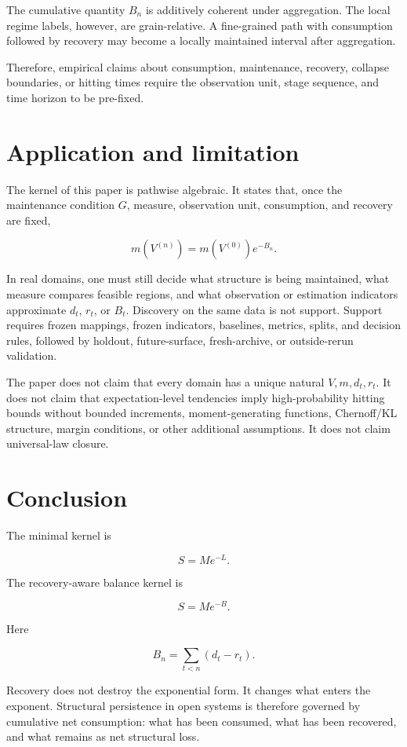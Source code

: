 \documentclass[12pt,a4paper]{article}
\begin{document}
The cumulative quantity \(B_{n}\) is additively coherent under aggregation. The local regime labels, however, are grain-relative. A fine-grained path with consumption followed by recovery may become a locally maintained interval after aggregation.

Therefore, empirical claims about consumption, maintenance, recovery, collapse boundaries, or hitting times require the observation unit, stage sequence, and time horizon to be pre-fixed.

\section{Application and limitation}\label{application-and-limitation}

The kernel of this paper is pathwise algebraic. It states that, once the maintenance condition \(G\), measure, observation unit, consumption, and recovery are fixed,

\[
m(V^{(n)})=m(V^{(0)})e^{-B_{n}}.
\]

In real domains, one must still decide what structure is being maintained, what measure compares feasible regions, and what observation or estimation indicators approximate \(d_{t}\), \(r_{t}\), or \(B_{t}\). Discovery on the same data is not support. Support requires frozen mappings, frozen indicators, baselines, metrics, splits, and decision rules, followed by holdout, future-surface, fresh-archive, or outside-rerun validation.

The paper does not claim that every domain has a unique natural \(V,m,d_{t},r_{t}\). It does not claim that expectation-level tendencies imply high-probability hitting bounds without bounded increments, moment-generating functions, Chernoff/KL structure, margin conditions, or other additional assumptions. It does not claim universal-law closure.

\section{Conclusion}\label{conclusion}

The minimal kernel is

\[
S=Me^{-L}.
\]

The recovery-aware balance kernel is

\[
S=Me^{-B}.
\]

Here

\[
B_{n}=\sum_{t<n}(d_{t}-r_{t}).
\]

Recovery does not destroy the exponential form. It changes what enters the exponent. Structural persistence in open systems is therefore governed by cumulative net consumption: what has been consumed, what has been recovered, and what remains as net structural loss.
\end{document}
